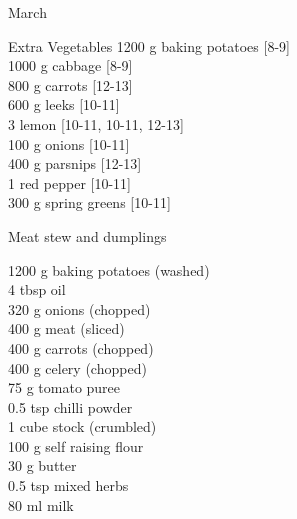 \begin{menu}{March}
      \begin{shoppinglist}{Extra Vegetables}
      1200 g baking potatoes {\scriptsize[8-9]}\\
      1000 g cabbage {\scriptsize[8-9]}\\
      800 g carrots {\scriptsize[12-13]}\\
      600 g leeks {\scriptsize[10-11]}\\
      3  lemon {\scriptsize[10-11, 10-11, 12-13]}\\
      100 g onions {\scriptsize[10-11]}\\
      400 g parsnips {\scriptsize[12-13]}\\
      1  red pepper {\scriptsize[10-11]}\\
      300 g spring greens {\scriptsize[10-11]}\\
      \end{shoppinglist}%
      \par\vfil %
    \vfil\clearpage
  
    \begin{recipe}{2}{Meat stew and dumplings}%
		\begin{ingredients}
		1200 g baking potatoes (washed) \\
	4 tbsp oil  \\
	320 g onions (chopped) \\
	400 g meat (sliced) \\
	400 g carrots (chopped) \\
	400 g celery (chopped) \\
	75 g tomato puree  \\
	0.5 tsp chilli powder  \\
	1 cube stock (crumbled) \\
	100 g self raising flour  \\
	30 g butter  \\
	0.5 tsp mixed herbs  \\
	80 ml milk  \\
	
		\end{ingredients}
	
	
	

\end{recipe}
\end{menu}
